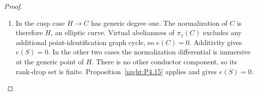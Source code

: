 \begin{proof}
\begin{enumerate}[label={$\langle1\rangle$\arabic*.},leftmargin=*]
\item In the cusp case $H\to C$ has generic degree one.
The normalization of $C$ is therefore $H$, an elliptic
curve. Virtual abelianness of $\pi_1(C)$ excludes any
additional point-identification graph cycle, so
$e(C)=0$. Additivity gives $e(S)=0$. In the other two
cases the normalization differential is immersive at
the generic point of $H$. There is no other conductor
component, so its rank-drop set is finite. Proposition~\ref{night:P4.15}
applies and gives $e(S)=0$.

\end{enumerate}
\end{proof}